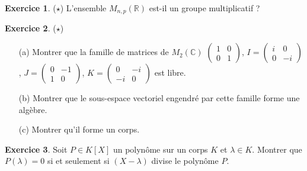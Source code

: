 \documentclass[11pt,a4paper]{article}
\theoremstyle{definition}
\newtheorem{exo}{Exercice}
\newcommand{\R}{\mathbb{R}}
\newcommand{\C}{\mathbb{C}}
\begin{document}
\begin{exo}($\star$)
L'ensemble $M_{n,p}(\R)$ est-il un groupe multiplicatif ?
\end{exo}


\begin{exo}($\star$)
\begin{itemize}
\item[(a)] Montrer que la famille de matrices de $M_2(\C)$ 
$\begin{pmatrix}
1 & 0 \\
0 & 1
\end{pmatrix}$, 
$I = \begin{pmatrix}
i & 0 \\
0 & -i
\end{pmatrix}$, 
$J =\begin{pmatrix}
0 & -1\\
1 & 0
\end{pmatrix}$, 
$K =\begin{pmatrix}
0 & -i\\
-i & 0
\end{pmatrix}$
est libre.
\item[(b)] Montrer que le sous-espace vectoriel engendré par cette famille forme une algèbre.
\item[(c)] Montrer qu'il forme un corps.
   \end{itemize}
\end{exo}



\begin{exo}
Soit $P \in K[X]$ un polynôme sur un corps $K$ et $\lambda \in K$. Montrer que $P(\lambda) = 0$ si et seulement si $(X-\lambda)$ divise le polynôme $P$.
\end{exo}
\end{document}

